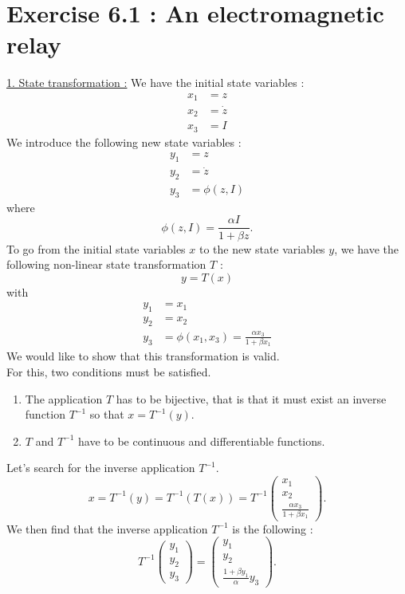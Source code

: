 \section*{Exercise 6.1 : An electromagnetic relay}
\underline{1. State transformation :}
We have the initial state variables :
\begin{align*}
x_1 & = z \\
x_2 & = \dot{z} \\
x_3 & = I 
\end{align*}
We introduce the following new state variables :
\begin{align*}
y_1 & = z \\
y_2 & = \dot{z} \\
y_3 & = \phi(z,I)
\end{align*}
where $$\phi(z,I) = \frac{\alpha I}{1+\beta z}.$$
To go from the initial state variables $x$ to the new state variables $y$, we have the following non-linear state transformation $T$ : $$y = T(x)$$ with
\begin{align*}
y_1 & = x_1 \\
y_2 & = x_2 \\
y_3 & = \phi(x_1,x_3) = \frac{\alpha x_3}{1+\beta x_1}
\end{align*}
We would like to show that this transformation is valid.\\
For this, two conditions must be satisfied.
\begin{enumerate}
\item The application $T$ has to be bijective, that is that it must exist an inverse function $T^{-1}$ so that $x = T^{-1}(y)$.
\item $T$ and $T^{-1}$ have to be continuous and differentiable functions.
\end{enumerate}
Let's search for the inverse application $T^{-1}$.
$$x = T^{-1}(y) = T^{-1}(T(x)) = T^{-1}
\begin{pmatrix}
x_1 \\
x_2 \\
\frac{\alpha x_3}{1+\beta x_1}
\end{pmatrix}.$$
We then find that the inverse application $T^{-1}$ is the following :
$$T^{-1}
\begin{pmatrix}
y_1 \\
y_2 \\
y_3
\end{pmatrix}
=
\begin{pmatrix}
y_1 \\
y_2 \\
\frac{1+\beta y_1}{\alpha}y_3
\end{pmatrix}.$$
